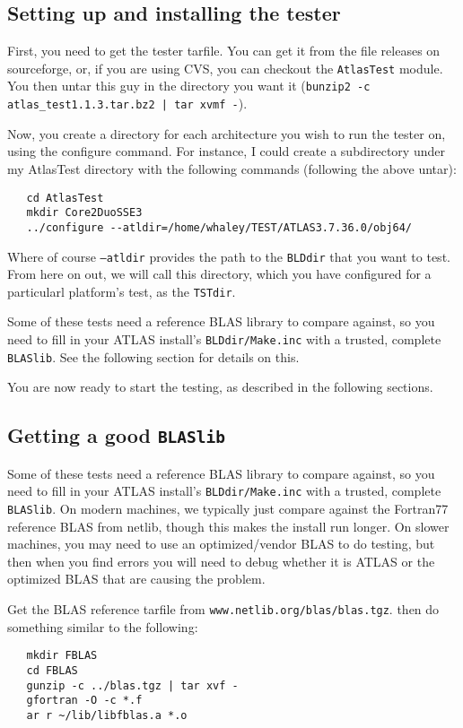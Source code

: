 \documentclass[11pt]{article}
\begin{document}
\subsection{Setting up and installing the tester}
First, you need to get the tester tarfile.  You can get it from the file 
releases on sourceforge, or, if you are using CVS, you can checkout the
{\tt AtlasTest} module.  You then untar this guy in the directory you
want it ({\tt bunzip2 -c atlas\_test1.1.3.tar.bz2 | tar xvmf -}).

Now, you create a directory for each architecture you wish to run
the tester on, using the configure command.  For instance, I could
create a subdirectory under my AtlasTest directory with the following
commands (following the above untar):
\begin{verbatim}
   cd AtlasTest
   mkdir Core2DuoSSE3
   ../configure --atldir=/home/whaley/TEST/ATLAS3.7.36.0/obj64/
\end{verbatim}
Where of course {\tt --atldir} provides the path to the {\tt BLDdir} that
you want to test.  From here on out, we will call this directory, which
you have configured for a particularl platform's test, as the {\tt TSTdir}.

Some of these tests need a reference BLAS library to compare against, so
you need to fill in your ATLAS install's {\tt BLDdir/Make.inc} with a
trusted, complete {\tt BLASlib}.  See the following section for details on
this.

You are now ready to start the testing, as described in the following sections.

\subsection{Getting a good {\tt BLASlib}}
\label{sec-GoodBlas}

Some of these tests need a reference BLAS library to compare against, so
you need to fill in your ATLAS install's {\tt BLDdir/Make.inc} with a
trusted, complete {\tt BLASlib}.  On modern machines, we typically just
compare against the Fortran77 reference BLAS from netlib, though this
makes the install run longer.  On slower machines, you may need to use
an optimized/vendor BLAS to do testing, but then when you find errors
you will need to debug whether it is ATLAS or the optimized BLAS that
are causing the problem.

Get the BLAS reference tarfile from {\tt www.netlib.org/blas/blas.tgz}.
then do something similar to the following:
\begin{verbatim}
   mkdir FBLAS
   cd FBLAS
   gunzip -c ../blas.tgz | tar xvf -
   gfortran -O -c *.f
   ar r ~/lib/libfblas.a *.o
\end{verbatim}
\end{document}
